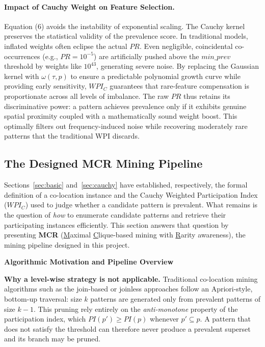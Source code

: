 \documentclass[12pt, letterpaper]{template}
\theoremstyle{definition}
\begin{document}
\paragraph{Impact of Cauchy Weight on Feature Selection.} 
Equation (6) avoids the instability of exponential scaling. The Cauchy kernel preserves the statistical validity of the prevalence score. In traditional models, inflated weights often eclipse the actual $PR$. Even negligible, coincidental co-occurrences (e.g., ${PR} = 10^{-5}$) are artificially pushed above the $\textit{min\_prev}$ threshold by weights like $10^{43}$, generating severe noise. By replacing the Gaussian kernel with $\omega(\tau, p)$ to ensure a predictable polynomial growth curve while providing early sensitivity, ${WPI}_{{C}}$ guarantees that rare-feature compensation is proportionate across all levels of imbalance. The raw ${PR}$ thus retains its discriminative power: a pattern achieves prevalence only if it exhibits genuine spatial proximity coupled with a mathematically sound weight boost. This optimally filters out frequency-induced noise while recovering moderately rare patterns that the traditional WPI discards.



\subsection{The Designed MCR Mining Pipeline}
\label{sec:mcr}

Sections~\ref{sec:basic} and~\ref{sec:cauchy} have established, respectively, the formal
definition of a co-location instance and the Cauchy Weighted Participation Index
($WPI_C$) used to judge whether a candidate pattern is prevalent. What remains is the
question of \emph{how} to enumerate candidate patterns and retrieve their participating
instances efficiently. This section answers that question by presenting \textbf{MCR}
(\underline{M}aximal \underline{C}lique-based mining with \underline{R}arity awareness),
the mining pipeline designed in this project.

\noindent\textbf{Algorithmic Motivation and Pipeline Overview}

\noindent\textbf{Why a level-wise strategy is not applicable.}
Traditional co-location mining algorithms such as the join-based or joinless approaches
follow an Apriori-style, bottom-up traversal: size $k$ patterns are generated only from
prevalent patterns of size $k-1$. This pruning rely entirely on the
\emph{anti-monotone} property of the participation index, which
$PI(p') \ge PI(p)$ whenever $p' \subseteq p$. A pattern that does not satisfy the threshold can
therefore never produce a prevalent superset and its branch may be pruned.
\end{document}
